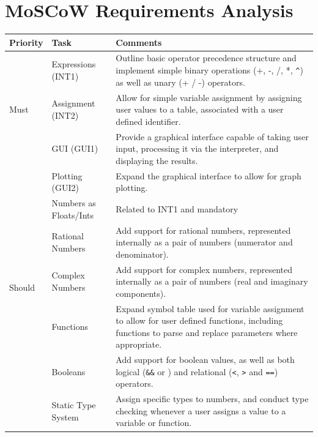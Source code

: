 \documentclass[a4paper, oneside, 11pt]{report}
\begin{document}
    \section{MoSCoW Requirements Analysis} \label{MOSCOW}
    \begin{center}
        \begin{tabular}{|p{1in}|p{2in}|p{2.5in}|} \hline
        Priority & Task & Comments \\ \hline \hline

        \multirow{3}{1in}{Must}
        & Expressions (INT1) & Outline basic operator precedence structure and implement simple binary operations (+, -, /, *, \verb|^|) as well as unary (+ / -) operators. \\ \cline{2-3}
        & Assignment (INT2) & Allow for simple variable assignment by assigning user values to a table, associated with a user defined identifier. \\ \cline{2-3}
        & GUI (GUI1) & Provide a graphical interface capable of taking user input, processing it via the interpreter, and displaying the results. \\ \cline{2-3}
        & Plotting (GUI2) & Expand the graphical interface to allow for graph plotting. \\ \cline{2-3}
        & Numbers as Floats/Ints & Related to INT1 and mandatory \\ \hline \hline

        \multirow{3}{1in}{Should}
        & Rational Numbers & Add support for rational numbers, represented internally as a pair of numbers (numerator and denominator). \\ \cline{2-3}
        & Complex Numbers & Add support for complex numbers, represented internally as a pair of numbers (real and imaginary components).  \\ \cline{2-3}
        & Functions & Expand symbol table used for variable assignment to allow for user defined functions, including functions to parse and replace parameters where appropriate.  \\ \cline{2-3}
        & Booleans & Add support for boolean values, as well as both logical (\verb|&&| or \textbar{}\textbar{}) and relational (\verb|<|, \verb|>| and \verb|==|) operators.   \\ \cline{2-3}
        & Static Type System & Assign specific types to numbers, and conduct type checking whenever a user assigns a value to a variable or function. \\ \hline \hline
        \end{tabular}
    \end{center}
\end{document}
